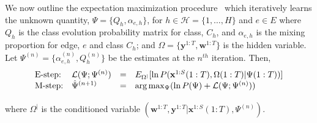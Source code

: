 \documentclass{bioinfo}
\begin{document}
\begin{methods}
We now outline the expectation maximization procedure~\citep{Bilmes98agentle,Mclachlan97embook} which
iteratively learns the unknown quantity, $\Psi = \{Q_{h},
\alpha_{e,h}\}$, for $h \in {\mathcal H} = \{1,\ldots, H\}$ and $e \in
E$ where  $Q_{h}$ is the class evolution
probability matrix for class, $C_h$, and $\alpha_{e,h}$ is the mixing
proportion for  edge, $e$ and class $C_h$; and $\Omega =
\{\mathbf{y}^{1:T},\mathbf{w}^{1:T}\}$ is
the hidden variable.  Let $\Psi^{(n)} = \{\alpha^{(n)}_{e,h},
Q^{(n)}_h\}$ be the estimates at the $n^{th}$ iteration. Then, 
\begin{equation}
  \label{eq:q-edge-mixture-em}
  \begin{array}[h]{llll}
  \textrm{E-step:} & {\mathcal L}(\Psi; \Psi^{(n)}) &=&
  E_{\Omega^{|} }  [ \ln P(\mathbf{x}^{1:S}(1:T), \Omega({1:T}) | \Psi({1:T}))] \\
\vspace{2 mm}
  \textrm{M-step:} & \hat{\Psi}^{(n+1)} &=& \arg\max_{\Psi} (\ln P(\Psi) +
  {\mathcal L}(\Psi; \Psi^{(n)} ) ) 
  \end{array}
\end{equation}
where $\Omega^{|}$ is the conditioned variable $(\mathbf{w}^{1:T},
\mathbf{y}^{1:T} | \mathbf{x}^{1:S}(1:T),  \Psi^{(n)})$.

\end{methods}
\end{document}
